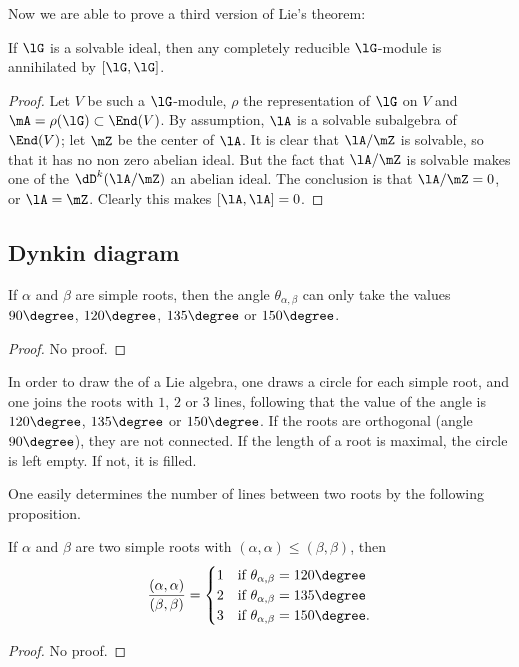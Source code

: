 Now we are able to prove a third version of Lie's theorem:
\begin{theorem}[Lie]\label{tho:Lie_trois}
	If $\lG$ is a solvable ideal, then any completely reducible $\lG$-module  is annihilated by $[\lG,\lG]$.
\end{theorem}

\begin{proof}
	Let $V$ be such a $\lG$-module, $\rho$ the representation of $\lG$ on $V$ and $\mA=\rho(\lG)\subset\End(V)$. By assumption, $\lA$ is a solvable subalgebra of $\End(V)$; let $\mZ$ be the center of $\lA$. It is clear that $\lA/\mZ$ is solvable, so that it has no non zero abelian ideal. But the fact that $\lA/\mZ$ is solvable makes one of the $\dD^k(\lA/\mZ)$ an abelian ideal. The conclusion is that $\lA/\mZ=0$, or $\lA=\mZ$. Clearly this makes $[\lA,\lA]=0$.
\end{proof}


\subsection{Dynkin diagram}

\begin{proposition}
	If $\alpha$ and $\beta$ are simple roots, then the angle $\theta_{\alpha,\beta}$ can only take the values $90\degree$, $120\degree$, $135\degree$ or $150\degree$.
\end{proposition}
\begin{proof}
	No proof.
\end{proof}

In order to draw the  of a Lie algebra, one draws a circle for each simple root, and one joins the roots with $1$, $2$ or $3$ lines, following that the value of the angle is $120\degree$, $135\degree$ or $150\degree$. If the roots are orthogonal (angle $90\degree$), they are not connected. If the length of a root is maximal, the circle is left empty. If not, it is filled.

One easily determines the number of lines between two roots by the following proposition.
\begin{proposition}         \label{PropProdNbLignes}
	If $\alpha$ and $\beta$ are two simple roots with $(\alpha,\alpha)\leq(\beta,\beta)$, then
	\begin{equation}
		\frac{ (\alpha,\alpha) }{ (\beta,\beta) }=
		\begin{cases}
			1 & \text{if }\theta_{\alpha,\beta}=120\degree  \\
			2 & \text{if }\theta_{\alpha,\beta}=135\degree  \\
			3 & \text{if }\theta_{\alpha,\beta}=150\degree.
		\end{cases}
	\end{equation}
\end{proposition}
\begin{proof}
	No proof.
\end{proof}

